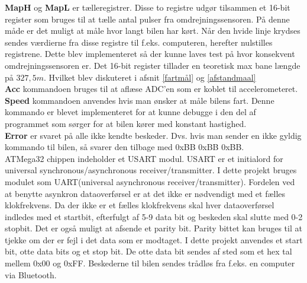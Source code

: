 \textbf{MapH} og \textbf{MapL} er tælleregistrer. Disse to registre udgør tilsammen et 16-bit register som bruges til at tælle antal pulser fra omdrejningssensoren. På denne måde er det muligt at måle hvor langt bilen har kørt. Når den hvide linje krydses sendes værdierne fra disse registre til f.eks. computeren, herefter nulstilles registrene. Dette blev implementeret så der kunne laves test på hvor konsekvent omdrejningssensoren er. Det 16-bit register tillader en teoretisk max bane længde på $327,5m$. Hvilket blev diskuteret i afsnit \ref{fartmål} og \ref{afstandmaal} \\

\textbf{Acc} kommandoen bruges til at aflæse ADC’en som er koblet til accelerometeret. \\

\textbf{Speed} kommandoen anvendes hvis man ønsker at måle bilens fart. Denne kommando er blevet implementeret for at kunne debugge i den del af programmet som sørger for at bilen kører med konstant hastighed. \\


\textbf{Error} er svaret på alle ikke kendte beskeder. Dvs. hvis man sender en ikke gyldig kommando til bilen, så svarer den tilbage med 0xBB 0xBB 0xBB. \\

ATMega32 chippen indeholder et USART modul. USART er et initialord for universal synchronous/asynchronous receiver/transmitter. I dette projekt bruges modulet som UART(universal asynchronous receiver/transmitter). Fordelen ved at benytte asynkron dataoverførsel er at det ikke er nødvendigt med et fælles klokfrekvens. Da der ikke er et fælles klokfrekvens skal hver dataoverførsel indledes med et startbit, efterfulgt af 5-9 data bit og beskeden skal slutte med 0-2 stopbit. Det er også muligt at afsende et parity bit. Parity bittet kan bruges til at tjekke om der er fejl i det data som er modtaget. I dette projekt anvendes et start bit, otte data bits og et stop bit. De otte data bit sendes af sted som et hex tal mellem 0x00 og 0xFF. Beskederne til bilen sendes trådløs fra f.eks. en computer via Bluetooth. \\
